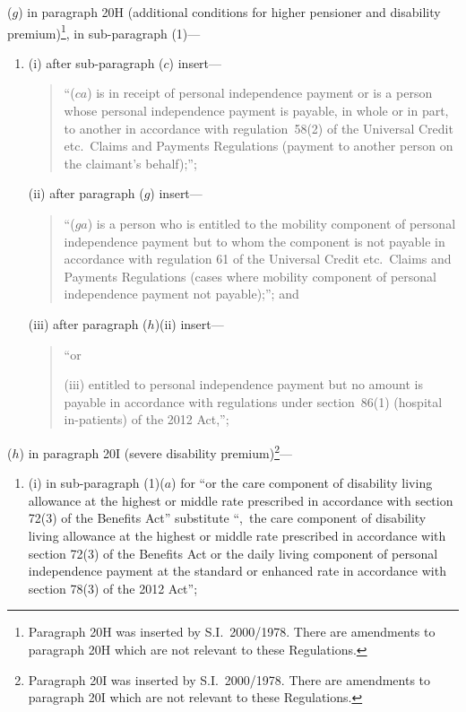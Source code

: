\documentclass[12pt,a4paper]{article}
\begin{document}
\begin{enumerate}
($g$) in paragraph 20H (additional conditions for higher pensioner and disability premium)\footnote{Paragraph 20H was inserted by S.I.~2000/1978. There are amendments to paragraph 20H which are not relevant to these Regulations.}, in sub-paragraph (1)—
\begin{enumerate}\item[]
(i) after sub-paragraph ($c$)  insert—
\begin{quotation}
“($ca$) is in receipt of personal independence payment or is a person whose personal independence payment is payable, in whole or in part, to another in accordance with regulation~58(2) of the Universal Credit etc.\ Claims and Payments Regulations (payment to another person on the claimant’s behalf);”;
\end{quotation}

(ii) after paragraph ($g$)  insert—
\begin{quotation}
“($ga$) is a person who is entitled to the mobility component of personal independence payment but to whom the component is not payable in accordance with regulation 61 of the Universal Credit etc.\ Claims and Payments Regulations (cases where mobility component of personal independence payment not payable);”; and
\end{quotation}

(iii) after paragraph ($h$)(ii)  insert—
\begin{quotation}
“or

(iii) entitled to personal independence payment but no amount is payable in accordance with regulations under section~86(1) (hospital in-patients) of the 2012 Act,”;
\end{quotation}
\end{enumerate}

($h$) in paragraph 20I (severe disability premium)\footnote{Paragraph 20I was inserted by S.I.~2000/1978. There are amendments to paragraph 20I which are not relevant to these Regulations.}—
\begin{enumerate}\item[]
(i) in sub-paragraph (1)($a$)  for “or the care component of disability living allowance at the highest or middle rate prescribed in accordance with section 72(3) of the Benefits Act” substitute “,~the care component of disability living allowance at the highest or middle rate prescribed in accordance with section 72(3) of the Benefits Act or the daily living component of personal independence payment at the standard or enhanced rate in accordance with section 78(3) of the 2012 Act”;


\end{enumerate}
\end{enumerate}
\end{document}

